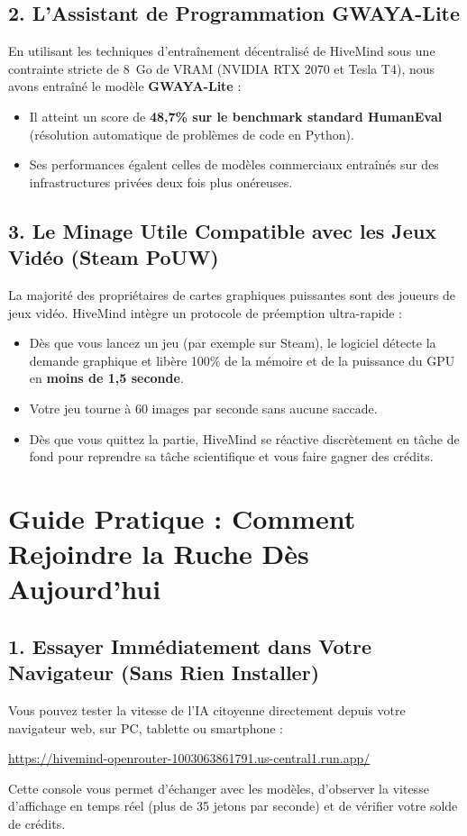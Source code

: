 \documentclass[11pt,a4paper]{article}
\begin{document}
\subsection{2. L'Assistant de Programmation GWAYA-Lite}
En utilisant les techniques d'entraînement décentralisé de HiveMind sous une contrainte stricte de 8~Go de VRAM (NVIDIA RTX 2070 et Tesla T4), nous avons entraîné le modèle \textbf{GWAYA-Lite} :
\begin{itemize}[leftmargin=1.8em]
    \item Il atteint un score de \textbf{48,7\% sur le benchmark standard HumanEval} (résolution automatique de problèmes de code en Python).
    \item Ses performances égalent celles de modèles commerciaux entraînés sur des infrastructures privées deux fois plus onéreuses.
\end{itemize}

\subsection{3. Le Minage Utile Compatible avec les Jeux Vidéo (Steam PoUW)}
La majorité des propriétaires de cartes graphiques puissantes sont des joueurs de jeux vidéo. HiveMind intègre un protocole de préemption ultra-rapide :
\begin{itemize}[leftmargin=1.8em]
    \item Dès que vous lancez un jeu (par exemple sur Steam), le logiciel détecte la demande graphique et libère 100\% de la mémoire et de la puissance du GPU en \textbf{moins de 1,5 seconde}.
    \item Votre jeu tourne à 60 images par seconde sans aucune saccade.
    \item Dès que vous quittez la partie, HiveMind se réactive discrètement en tâche de fond pour reprendre sa tâche scientifique et vous faire gagner des crédits.
\end{itemize}

\section{Guide Pratique : Comment Rejoindre la Ruche Dès Aujourd'hui}

\subsection{1. Essayer Immédiatement dans Votre Navigateur (Sans Rien Installer)}
Vous pouvez tester la vitesse de l'IA citoyenne directement depuis votre navigateur web, sur PC, tablette ou smartphone :
\begin{center}
    \url{https://hivemind-openrouter-1003063861791.us-central1.run.app/}
\end{center}
Cette console vous permet d'échanger avec les modèles, d'observer la vitesse d'affichage en temps réel (plus de 35 jetons par seconde) et de vérifier votre solde de crédits.
\end{document}
